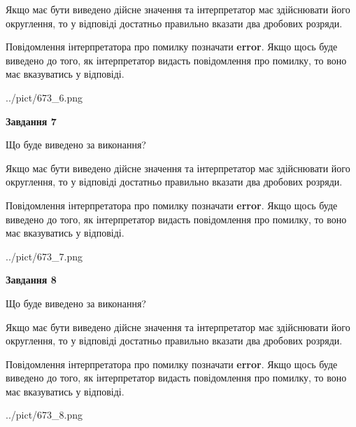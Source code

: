 \documentclass[12pt, ukrainian]{article}
\begin{document}
{\begin {Large}
Якщо має бути виведено дійсне значення та інтерпретатор має здійснювати його округлення, 
то у відповіді достатньо правильно вказати два дробових розряди.

Повідомлення інтерпретатора про помилку позначати \textbf{error}.
Якщо щось буде виведено до того, як інтерпретатор видасть повідомлення про помилку, 
то воно має вказуватись у відповіді. \par

\begin{center}
	{../pict/673_6.png}
\end{center}
\newpage

{\begin {center}\textbf{Завдання 7}\end {center}}\par
Що буде виведено за виконання? \par

Якщо має бути виведено дійсне значення та інтерпретатор має здійснювати його округлення, 
то у відповіді достатньо правильно вказати два дробових розряди.

Повідомлення інтерпретатора про помилку позначати \textbf{error}.
Якщо щось буде виведено до того, як інтерпретатор видасть повідомлення про помилку, 
то воно має вказуватись у відповіді. \par

\begin{center}
	{../pict/673_7.png}
\end{center}
\newpage

{\begin {center}\textbf{Завдання 8}\end {center}}\par
Що буде виведено за виконання? \par

Якщо має бути виведено дійсне значення та інтерпретатор має здійснювати його округлення, 
то у відповіді достатньо правильно вказати два дробових розряди.

Повідомлення інтерпретатора про помилку позначати \textbf{error}.
Якщо щось буде виведено до того, як інтерпретатор видасть повідомлення про помилку, 
то воно має вказуватись у відповіді. \par

\begin{center}
	{../pict/673_8.png}
\end{center}
\newpage


\end{Large}}
\end{document}
